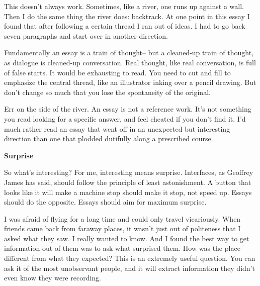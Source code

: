 This doesn't always work.
                  Sometimes, like a river, one runs up against a wall. Then I do
                  the same thing the river does: backtrack. At one point in this
                  essay I found that after following a certain thread I ran out
                  of ideas. I had to go back seven paragraphs and start over in
                  another direction.

Fundamentally an essay is a
                  train of thought-- but a cleaned-up train of thought, as
                  dialogue is cleaned-up conversation. Real thought, like real
                  conversation, is full of false starts. It would be exhausting
                  to read. You need to cut and fill to emphasize the central
                  thread, like an illustrator inking over a pencil drawing. But
                  don't change so much that you lose the spontaneity of the
                  original.

Err on the side of the river. An essay is
                  not a reference work. It's not something you read looking for
                  a specific answer, and feel cheated if you don't find it. I'd
                  much rather read an essay that went off in an unexpected but
                  interesting direction than one that plodded dutifully along a
                  prescribed course.

\textbf{Surprise}

So
                  what's interesting? For me, interesting means surprise.
                  Interfaces, as Geoffrey James has said, should follow the
                  principle of least astonishment. A button that looks like it
                  will make a machine stop should make it stop, not speed up.
                  Essays should do the opposite. Essays should aim for maximum
                  surprise.

I was afraid of flying for a long time
                  and could only travel vicariously. When friends came back from
                  faraway places, it wasn't just out of politeness that I asked
                  what they saw. I really wanted to know. And I found the best
                  way to get information out of them was to ask what surprised
                  them. How was the place different from what they expected?
                  This is an extremely useful question. You can ask it of the
                  most unobservant people, and it will extract information they
                  didn't even know they were recording.

